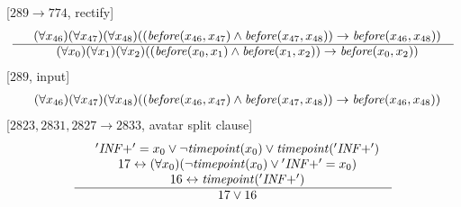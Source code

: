 \documentclass[border=10pt,preview,multi,varwidth=\maxdimen]{standalone}
\newenvironment{VampireStep}{}{}
\newenvironment{VampireInference}{%
   \begin{array}{c}}{\end{array}}
\newenvironment{VampirePremise}%
   {\begin{array}{l}}%
   {\end{array}}
\newenvironment{VampireConclusion}%
   {\begin{array}{l}}%
   {\end{array}}
\newcommand{\VPremiseSeparator}{\\}
\newcommand{\VConclusionSeparator}{\\ \hline}
\newcommand{\Vor}{\vee}
\newcommand{\Vand}{\wedge}
\newcommand{\Vimp}{\rightarrow}
\newcommand{\Viff}{\leftrightarrow}
\begin{document}
\begin{VampireStep}
[$289\rightarrow 774$, rectify]\\
\[\begin{VampireInference}
\begin{VampirePremise}%
~~(\forall x_{46} )(\forall x_{47} )(\forall x_{48} )((\mathit{before} (x_{46},x_{47}) \Vand \mathit{before} (x_{47},x_{48})) \Vimp \mathit{before} (x_{46},x_{48}))
\end{VampirePremise}
\VConclusionSeparator
\begin{VampireConclusion}
~~(\forall x_{0} )(\forall x_{1} )(\forall x_{2} )((\mathit{before} (x_{0},x_{1}) \Vand \mathit{before} (x_{1},x_{2})) \Vimp \mathit{before} (x_{0},x_{2}))
\end{VampireConclusion}
\end{VampireInference}
\]
\end{VampireStep}
\begin{VampireStep}
[$289$, input]\\
\[\begin{VampireInference}
\begin{VampireConclusion}
~~(\forall x_{46} )(\forall x_{47} )(\forall x_{48} )((\mathit{before} (x_{46},x_{47}) \Vand \mathit{before} (x_{47},x_{48})) \Vimp \mathit{before} (x_{46},x_{48}))
\end{VampireConclusion}
\end{VampireInference}
\]
\end{VampireStep}
\begin{VampireStep}
[$2823,2831,2827\rightarrow 2833$, avatar split clause]\\
\[\begin{VampireInference}
\begin{VampirePremise}%
~~\mathit{'INF+'} = x_{0} \Vor \neg \mathit{timepoint} (x_{0}) \Vor \mathit{timepoint} (\mathit{'INF+'})
\end{VampirePremise}
\VPremiseSeparator
\begin{VampirePremise}%
~~17 \Viff (\forall x_{0} )(\neg \mathit{timepoint} (x_{0}) \Vor \mathit{'INF+'} = x_{0})
\end{VampirePremise}
\VPremiseSeparator
\begin{VampirePremise}%
~~16 \Viff \mathit{timepoint} (\mathit{'INF+'})
\end{VampirePremise}
\VConclusionSeparator
\begin{VampireConclusion}
~~17 \Vor 16
\end{VampireConclusion}
\end{VampireInference}
\]
\end{VampireStep}
\end{document}
